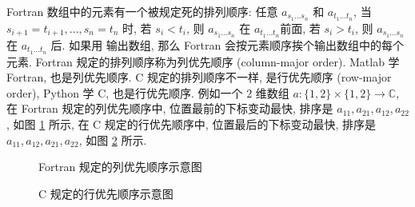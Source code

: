 \def\la{\leftarrow}
\def\ra{\rightarrow}
\def\ua{\uparrow}
\def\da{\downarrow}
Fortran 数组中的元素有一个被规定死的排列顺序: 任意 $a_{s_1\dots s_n}$ 和 $a_{t_1\dots t_n}$, 当 $s_{i+1}=t_{i+1}, \dots, s_n=t_n$ 时, 若 $s_i<t_i$, 则 $a_{s_1\dots s_n}$ 在 $a_{t_1\dots t_n}$前面, 若 $s_i>t_i$, 则 $a_{s_1\dots s_n}$ 在 $a_{t_1\dots t_n}$ 后. 如果用  输出数组, 那么 Fortran 会按元素顺序挨个输出数组中的每个元素. Fortran 规定的排列顺序称为列优先顺序 (column-major order). Matlab 学 Fortran, 也是列优先顺序. C 规定的排列顺序不一样, 是行优先顺序 (row-major order), Python 学 C, 也是行优先顺序. 例如一个 $2$ 维数组 $a\colon \{1,2\}\times\{1,2\}\to\mathbb{C}$, 在 Fortran 规定的列优先顺序中, 位置最前的下标变动最快, 排序是 $a_{11},a_{21},a_{12},a_{22}$, 如图 \ref{column_major} 所示, 在 C 规定的行优先顺序中, 位置最后的下标变动最快, 排序是 $a_{11},a_{12},a_{21},a_{22}$, 如图 \ref{row_major} 所示.
\begin{figure}[htbp]
    \centering
    \caption{Fortran 规定的列优先顺序示意图}
    \label{column_major}
\end{figure}
\begin{figure}[htbp]
    \centering
    \caption{C 规定的行优先顺序示意图}
    \label{row_major}
\end{figure}

